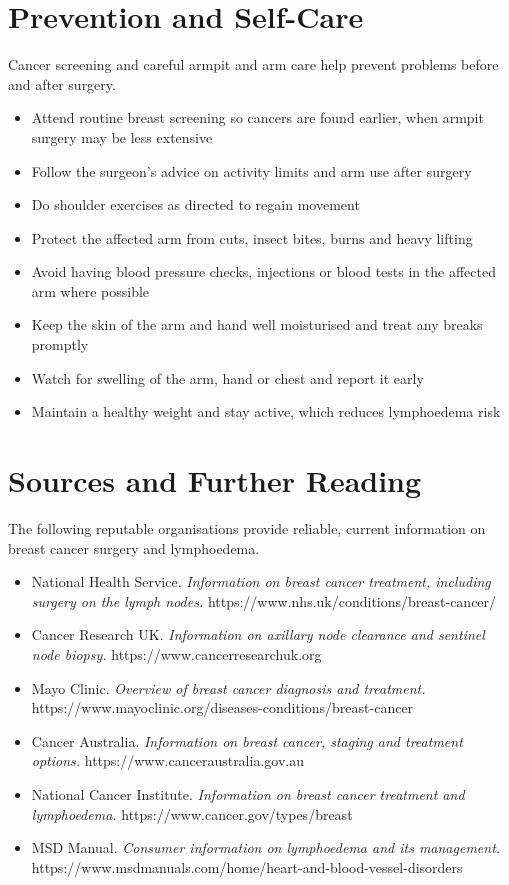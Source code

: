 \section*{Prevention and Self-Care}
Cancer screening and careful armpit and arm care help prevent problems before and after surgery.

\begin{itemize}
    \item Attend routine breast screening so cancers are found earlier, when armpit surgery may be less extensive
    \item Follow the surgeon's advice on activity limits and arm use after surgery
    \item Do shoulder exercises as directed to regain movement
    \item Protect the affected arm from cuts, insect bites, burns and heavy lifting
    \item Avoid having blood pressure checks, injections or blood tests in the affected arm where possible
    \item Keep the skin of the arm and hand well moisturised and treat any breaks promptly
    \item Watch for swelling of the arm, hand or chest and report it early
    \item Maintain a healthy weight and stay active, which reduces lymphoedema risk
\end{itemize}

\section*{Sources and Further Reading}
The following reputable organisations provide reliable, current information on breast cancer surgery and lymphoedema.

\begin{itemize}
    \item National Health Service. \textit{Information on breast cancer treatment, including surgery on the lymph nodes.} https://www.nhs.uk/conditions/breast-cancer/
    \item Cancer Research UK. \textit{Information on axillary node clearance and sentinel node biopsy.} https://www.cancerresearchuk.org
    \item Mayo Clinic. \textit{Overview of breast cancer diagnosis and treatment.} https://www.mayoclinic.org/diseases-conditions/breast-cancer
    \item Cancer Australia. \textit{Information on breast cancer, staging and treatment options.} https://www.canceraustralia.gov.au
    \item National Cancer Institute. \textit{Information on breast cancer treatment and lymphoedema.} https://www.cancer.gov/types/breast
    \item MSD Manual. \textit{Consumer information on lymphoedema and its management.} https://www.msdmanuals.com/home/heart-and-blood-vessel-disorders
\end{itemize}
